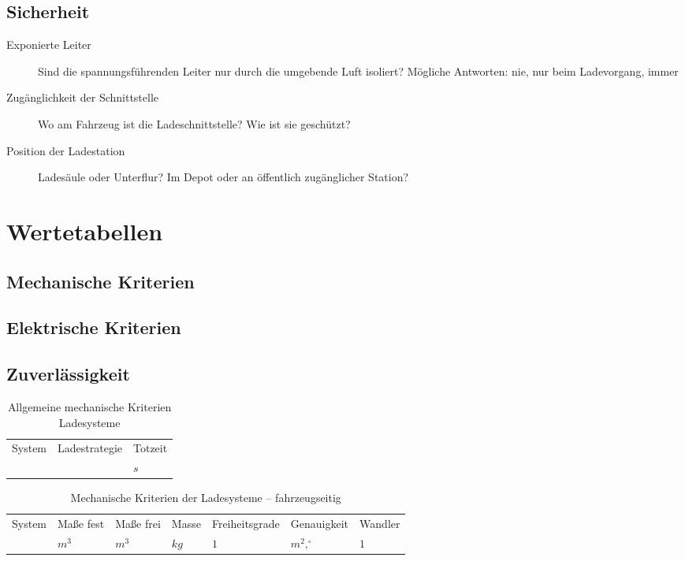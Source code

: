 \subsection{Sicherheit}
\begin{description}
	\item [Exponierte Leiter]
	Sind die spannungsführenden Leiter nur durch die umgebende Luft isoliert? Mögliche Antworten: nie, nur beim Ladevorgang, immer
	\item [Zugänglichkeit der Schnittstelle]
	Wo am Fahrzeug ist die Ladeschnittstelle? Wie ist sie geschützt?
	\item [Position der Ladestation]
	Ladesäule oder Unterflur? Im Depot oder an öffentlich zugänglicher Station?	
\end{description}


\section{Wertetabellen}
\label{sec_tabellen_ladesysteme}

\subsection{Mechanische Kriterien}

\subsection{Elektrische Kriterien}

\subsection{Zuverlässigkeit}

\begin{table}\centering
	\begin{tabularx}{\linewidth}{XXX}
		\toprule
		System & Ladestrategie & Totzeit \\
		       &               & $s$     \\ \midrule
	\end{tabularx}
	\caption{Allgemeine mechanische Kriterien Ladesysteme}
	\label{tab_mech_Ladesys_allg}
\end{table}

\begin{table}\centering
	\begin{tabularx}{\linewidth}{Xllllll}
		\toprule
		System & Maße fest & Maße frei & Masse & Freiheitsgrade & Genauigkeit    & Wandler \\
		       & $m^3$     & $m^3$     & $kg$  & $1$            & $m^2,^{\circ}$ & $1$     \\ \midrule
	\end{tabularx}
	\caption{Mechanische Kriterien der Ladesysteme – fahrzeugseitig}
	\label{tab_mech_Ladesys_fzg}
\end{table}

